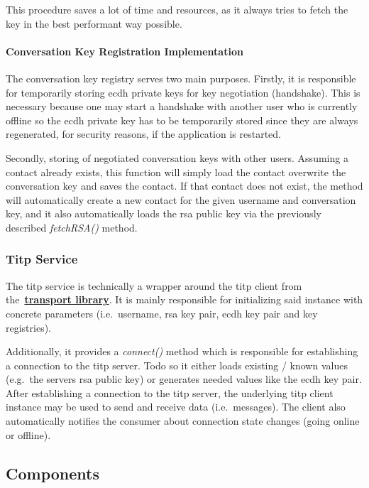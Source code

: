 This procedure saves a lot of time and resources, as it always tries to fetch the key in the best performant way
possible.

\paragraph{Conversation Key Registration Implementation}
The conversation key registry serves two main purposes.
Firstly, it is responsible for temporarily storing \ac{ecdh} private keys for key negotiation (handshake).
This is necessary because one may start a handshake with another user who is currently offline so the \ac{ecdh} private
key has to be temporarily stored since they are always regenerated, for security reasons, if the application is
restarted.

Secondly, storing of negotiated conversation keys with other users.
Assuming a contact already exists, this function will simply load the contact overwrite the conversation key and saves
the contact.
If that contact does not exist, the method will automatically create a new contact for the given username and
conversation key, and it also automatically loads the \ac{rsa} public key via the previously described
\textit{fetchRSA()} method.

\subsubsection{Titp Service}

The \ac{titp} service is technically a wrapper around the \ac{titp} client from
the~\hyperref[subsec:transport]{\textbf{transport library}}.
It is mainly responsible for initializing said instance with concrete parameters (i.e.\ username, \ac{rsa} key pair,
\ac{ecdh} key pair and key registries).

Additionally, it provides a \textit{connect()} method which is responsible for establishing a connection to the
\ac{titp} server.
Todo so it either loads existing / known values (e.g.\ the servers \ac{rsa} public key) or generates needed values like
the \ac{ecdh} key pair.
After establishing a connection to the \ac{titp} server, the underlying \ac{titp} client instance may be used to send
and receive data (i.e.\ messages).
The client also automatically notifies the consumer about connection state changes (going online or offline).

\subsection{Components}\label{subsec:components}

